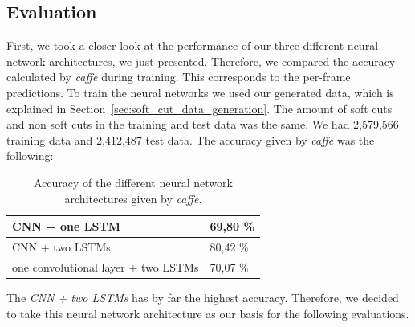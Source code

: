 \subsection{Evaluation}
\label{sec:soft_cut_evaluation}

First, we took a closer look at the performance of our three different neural network architectures, we just presented.
Therefore, we compared the accuracy calculated by \textit{caffe} during training.
This corresponds to the per-frame predictions.
To train the neural networks we used our generated data, which is explained in Section~\ref{sec:soft_cut_data_generation}.
The amount of soft cuts and non soft cuts in the training and test data was the same.
We had 2,579,566 training data and 2,412,487 test data.
The accuracy given by \textit{caffe} was the following:
\begin{table}[ht]
	\centering
	\begin{tabular}{l|l}
	CNN + one LSTM                      & 69,80 \% \\ \hline
	CNN + two LSTMs                     & 80,42 \% \\ \hline
	one convolutional layer + two LSTMs & 70,07 \% \\
	\end{tabular}
	\caption{Accuracy of the different neural network architectures given by \textit{caffe}.}
	\label{tab:caffe_accurary}
\end{table}
The \textit{CNN + two LSTMs} has by far the highest accuracy.
Therefore, we decided to take this neural network architecture as our basis for the following evaluations.


